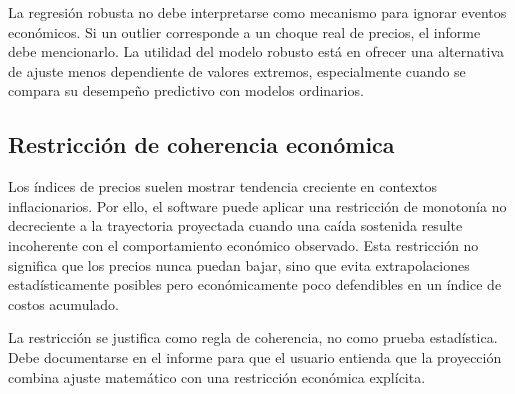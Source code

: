 La regresión robusta no debe interpretarse como mecanismo para ignorar eventos económicos. Si un outlier corresponde a un choque real de precios, el informe debe mencionarlo. La utilidad del modelo robusto está en ofrecer una alternativa de ajuste menos dependiente de valores extremos, especialmente cuando se compara su desempeño predictivo con modelos ordinarios.

\subsection{Restricción de coherencia económica}

Los índices de precios suelen mostrar tendencia creciente en contextos inflacionarios. Por ello, el software puede aplicar una restricción de monotonía no decreciente a la trayectoria proyectada cuando una caída sostenida resulte incoherente con el comportamiento económico observado. Esta restricción no significa que los precios nunca puedan bajar, sino que evita extrapolaciones estadísticamente posibles pero económicamente poco defendibles en un índice de costos acumulado.

La restricción se justifica como regla de coherencia, no como prueba estadística. Debe documentarse en el informe para que el usuario entienda que la proyección combina ajuste matemático con una restricción económica explícita.
